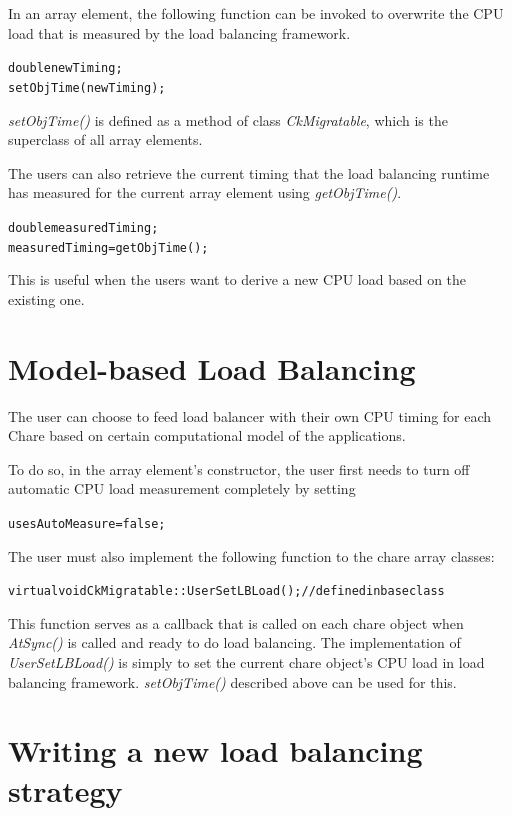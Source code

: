 In an array element, the following function can be invoked to overwrite the 
CPU load that is measured by the load balancing framework.

\begin{alltt}
   double newTiming;
   setObjTime(newTiming);
\end{alltt}

{\em setObjTime()} is defined as a method of class {\em CkMigratable}, which is
the superclass of all array elements.

The users can also retrieve the current timing that the load balancing runtime
has measured for the current array element using {\em getObjTime()}. 
 
\begin{alltt} 
   double measuredTiming; 
   measuredTiming = getObjTime(); 
\end{alltt}

This is useful when the users want to derive a new CPU load based on the 
existing one.

\section{Model-based Load Balancing}

The user can choose to feed load balancer with their own CPU
timing for each Chare based on certain computational model of the applications.

To do so, in the array element's constructor, the user first needs to turn off 
automatic CPU load measurement completely by setting

\begin{alltt}
   usesAutoMeasure = false;
\end{alltt}

The user must also implement the following function to the chare array
classes:

\begin{alltt}
   virtual void CkMigratable::UserSetLBLoad();      // defined in base class
\end{alltt}

This function serves as a callback that is called on each chare object when
{\em AtSync()} is called and ready to do load balancing. The implementation of
{\em UserSetLBLoad()} is simply to set the current chare object's CPU load in
load balancing framework. {\em setObjTime()} described above can be used for
this.

\section{Writing a new load balancing strategy}

